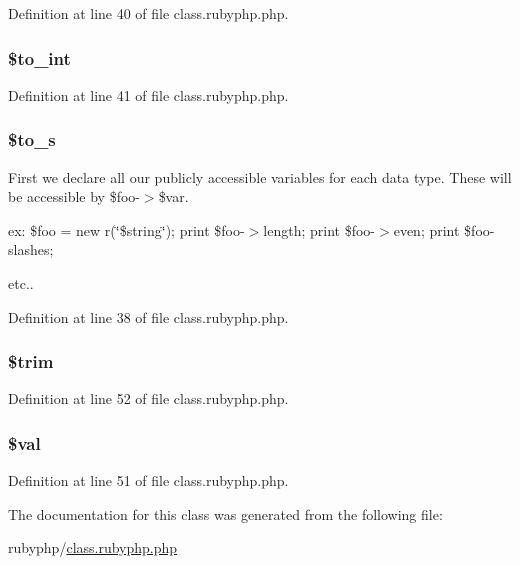 Definition at line 40 of file class.\-rubyphp.\-php.

\hypertarget{classr_a41eb7bfd09e3b6ad118551accfaad638}{
\subsubsection[{\$to\-\_\-int}]{\setlength{\rightskip}{0pt plus 5cm}\${\bf to\-\_\-int}}}\label{classr_a41eb7bfd09e3b6ad118551accfaad638}


Definition at line 41 of file class.\-rubyphp.\-php.

\hypertarget{classr_a5469620d055732b419fff71704232d2f}{
\subsubsection[{\$to\-\_\-s}]{\setlength{\rightskip}{0pt plus 5cm}\${\bf to\-\_\-s}}}\label{classr_a5469620d055732b419fff71704232d2f}
First we declare all our publicly accessible variables for each data type. These will be accessible by \$foo-\/$>$\$var.

ex\-: \$foo = new r(\char`\"{}\$string\char`\"{}); print \$foo-\/$>$length; print \$foo-\/$>$even; print \$foo-\/slashes;

etc.. 

Definition at line 38 of file class.\-rubyphp.\-php.

\hypertarget{classr_a0ca8b395aaa07c4aac3bdb1f9964d4f5}{
\subsubsection[{\$trim}]{\setlength{\rightskip}{0pt plus 5cm}\$trim}}\label{classr_a0ca8b395aaa07c4aac3bdb1f9964d4f5}


Definition at line 52 of file class.\-rubyphp.\-php.

\hypertarget{classr_aac81a74a7b30767af29bfd9a695636df}{
\subsubsection[{\$val}]{\setlength{\rightskip}{0pt plus 5cm}\${\bf val}}}\label{classr_aac81a74a7b30767af29bfd9a695636df}


Definition at line 51 of file class.\-rubyphp.\-php.



The documentation for this class was generated from the following file\-:\begin{DoxyCompactItemize}
\item 
rubyphp/\hyperlink{class_8rubyphp_8php}{class.\-rubyphp.\-php}\end{DoxyCompactItemize}
